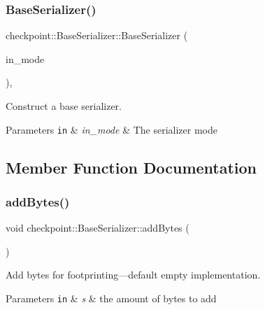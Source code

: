 \subsubsection{\texorpdfstring{Base\+Serializer()}{BaseSerializer()}}
{\footnotesize\ttfamily checkpoint\+::\+Base\+Serializer\+::\+Base\+Serializer (\begin{DoxyParamCaption}\item[{\hyperlink{namespacecheckpoint_ae2509499ccd8b1dc48fb535bf8aa3059}{Mode\+Type} const \&}]{in\+\_\+mode }\end{DoxyParamCaption})\hspace{0.3cm}{\ttfamily [inline]}, {\ttfamily [explicit]}}



Construct a base serializer. 


\begin{DoxyParams}[1]{Parameters}
\mbox{\tt in}  & {\em in\+\_\+mode} & The serializer mode \\
\hline
\end{DoxyParams}


\subsection{Member Function Documentation}
\mbox{\label{structcheckpoint_1_1_base_serializer_a9c9d32a50074084f78f7c5e049227f25}} 
\subsubsection{\texorpdfstring{add\+Bytes()}{addBytes()}}
{\footnotesize\ttfamily void checkpoint\+::\+Base\+Serializer\+::add\+Bytes (\begin{DoxyParamCaption}\item[{std\+::size\+\_\+t}]{ }\end{DoxyParamCaption})\hspace{0.3cm}{\ttfamily [inline]}}



Add bytes for footprinting---default empty implementation. 


\begin{DoxyParams}[1]{Parameters}
\mbox{\tt in}  & {\em s} & the amount of bytes to add \\
\hline
\end{DoxyParams}
\mbox{\label{structcheckpoint_1_1_base_serializer_a4d3efc116b1962fe88c14aadcdf4df9e}} 
